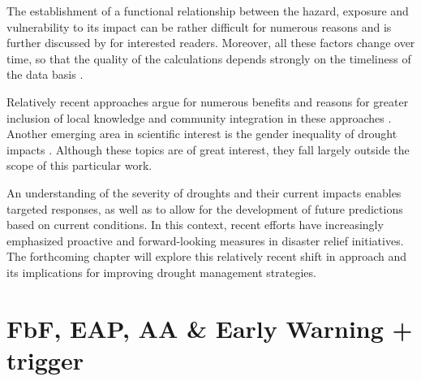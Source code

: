 The establishment of a functional relationship between the hazard, exposure and vulnerability to its impact can be rather difficult for numerous reasons and is further discussed by \autocite{boultDroughtImpactbasedForecasting2022} for interested readers. Moreover, all these factors change over time, so that the quality of the calculations depends strongly on the timeliness of the data basis \autocite{harrowsmithFutureForecastImpact2020}. 

Relatively recent approaches argue for numerous benefits and reasons for greater inclusion of local knowledge and community integration in these approaches \autocite{balehegnIndigenousWeatherClimate2019,dubeFrameworkIntegrationTraditional2016,ebhuomaFrameworkIntegratingScientific2020,giordanoIntegrationLocalScientific2013a,greyIntegratingLocalIndigenous2020,hermansExploringIntegrationLocal2022a,mercerCultureDisasterRisk2012,mutasaKnowledgeApartheidDisaster2015,nyetanyaneIntegrationIndigenousKnowledge2020,nyongValueIndigenousKnowledge2007}. Another emerging area in scientific interest is the gender inequality of drought impacts \autocite{acharyaWhenRiverTalks2019,fanningDroughtDisplacementLivelihoods2018,hiwasakiLocalIndigenousKnowledge2015,mustafaGenderingFloodEarly2015,sachsRoutledgeHandbookGender2020,saniGenderOtherVulnerabilities2022}. Although these topics are of great interest, they fall largely outside the scope of this particular work.

An understanding of the severity of droughts and their current impacts enables targeted responses, as well as to allow for the development of future predictions based on current conditions. In this context, recent efforts have increasingly emphasized proactive and forward-looking measures in disaster relief initiatives. The forthcoming chapter will explore this relatively recent shift in approach and its implications for improving drought management strategies.


\section{FbF, EAP, AA & Early Warning + trigger}


